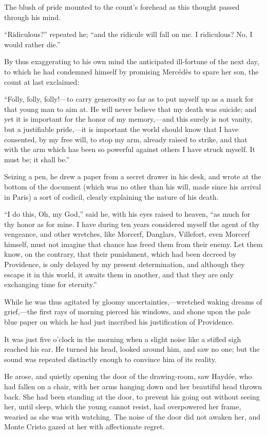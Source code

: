 The blush of pride mounted to the count’s forehead as this thought
passed through his mind.

“Ridiculous?” repeated he; “and the ridicule will fall on me. I
ridiculous? No, I would rather die.”

By thus exaggerating to his own mind the anticipated ill-fortune of the
next day, to which he had condemned himself by promising Mercédès to
spare her son, the count at last exclaimed:

“Folly, folly, folly!—to carry generosity so far as to put myself up as
a mark for that young man to aim at. He will never believe that my
death was suicide; and yet it is important for the honor of my
memory,—and this surely is not vanity, but a justifiable pride,—it is
important the world should know that I have consented, by my free will,
to stop my arm, already raised to strike, and that with the arm which
has been so powerful against others I have struck myself. It must be;
it shall be.”

Seizing a pen, he drew a paper from a secret drawer in his desk, and
wrote at the bottom of the document (which was no other than his will,
made since his arrival in Paris) a sort of codicil, clearly explaining
the nature of his death.

“I do this, Oh, my God,” said he, with his eyes raised to heaven, “as
much for thy honor as for mine. I have during ten years considered
myself the agent of thy vengeance, and other wretches, like Morcerf,
Danglars, Villefort, even Morcerf himself, must not imagine that chance
has freed them from their enemy. Let them know, on the contrary, that
their punishment, which had been decreed by Providence, is only delayed
by my present determination, and although they escape it in this world,
it awaits them in another, and that they are only exchanging time for
eternity.”

While he was thus agitated by gloomy uncertainties,—wretched waking
dreams of grief,—the first rays of morning pierced his windows, and
shone upon the pale blue paper on which he had just inscribed his
justification of Providence.

It was just five o’clock in the morning when a slight noise like a
stifled sigh reached his ear. He turned his head, looked around him,
and saw no one; but the sound was repeated distinctly enough to
convince him of its reality.

He arose, and quietly opening the door of the drawing-room, saw Haydée,
who had fallen on a chair, with her arms hanging down and her beautiful
head thrown back. She had been standing at the door, to prevent his
going out without seeing her, until sleep, which the young cannot
resist, had overpowered her frame, wearied as she was with watching.
The noise of the door did not awaken her, and Monte Cristo gazed at her
with affectionate regret.

